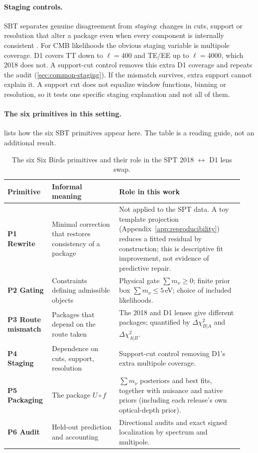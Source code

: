 \documentclass[11pt]{article}
\theoremstyle{remark}
\newcommand{\Lens}{f}
\newcommand{\Completion}{U}
\newcommand{\dchi}{\Delta \chi^2}
\newcommand{\mnu}{\sum m_\nu}
\numberwithin{equation}{section}
\begin{document}
\paragraph{Staging controls.}
SBT separates genuine disagreement from \emph{staging}: changes in cuts, support or resolution that alter a package even when every component is internally consistent \cite{sixbirds_foundations}. For CMB likelihoods the obvious staging variable is multipole coverage. D1 covers TT down to $\ell=400$ and TE/EE up to $\ell=4000$, which 2018 does not. A support-cut control removes this extra D1 coverage and repeats the audit (\cref{sec:common-staging}). If the mismatch survives, extra support cannot explain it. A support cut does not equalize window functions, binning or resolution, so it tests one specific staging explanation and not all of them.

\paragraph{The six primitives in this setting.}
 lists how the six SBT primitives appear here. The table is a reading guide, not an additional result.

\begin{table}[t]
  \centering
  \caption{The six Six Birds primitives and their role in the SPT 2018 $\leftrightarrow$ D1 lens swap.}
  \label{tab:sixbirds_primitives}
  \setlength{\tabcolsep}{4pt}
  \renewcommand{\arraystretch}{1.08}
  \small
  \begin{tabular}{@{}>{\raggedright\arraybackslash}p{0.17\linewidth} >{\raggedright\arraybackslash}p{0.27\linewidth} >{\raggedright\arraybackslash}p{0.50\linewidth}@{}}
    \toprule
    Primitive & Informal meaning & Role in this work \\
    \midrule
    \textbf{P1 Rewrite} & Minimal correction that restores consistency of a package &
    Not applied to the SPT data. A toy template projection (Appendix~\ref{app:reproducibility}) reduces a fitted residual by construction; this is descriptive fit improvement, not evidence of predictive repair. \\
    \textbf{P2 Gating} & Constraints defining admissible objects &
    Physical gate $\mnu\ge0$; finite prior box $\mnu\le5$\,eV; choice of included likelihoods. \\
    \textbf{P3 Route mismatch} & Packages that depend on the route taken &
    The 2018 and D1 lenses give different packages; quantified by $\dchi_{B|A}$ and $\dchi_{A|B}$. \\
    \textbf{P4 Staging} & Dependence on cuts, support, resolution &
    Support-cut control removing D1's extra multipole coverage. \\
    \textbf{P5 Packaging} & The package $\Completion\circ\Lens$ &
    $\mnu$ posteriors and best fits, together with nuisance and native priors (including each release's own optical-depth prior). \\
    \textbf{P6 Audit} & Held-out prediction and accounting &
    Directional audits and exact signed localization by spectrum and multipole. \\
    \bottomrule
  \end{tabular}
\end{table}
\end{document}
